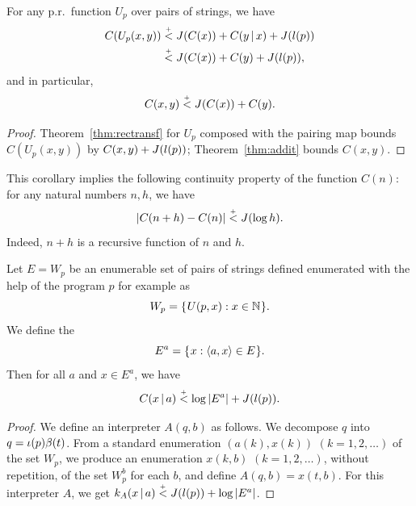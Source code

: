 \begin{corollary}
  \leanok
   \label{cy:funcofpair}
 For any p.r.~function \( U_{p} \) over pairs of strings, we have 
 \begin{align*} 
C(U_{p}(x,y)) &\stackrel{{}_+}{<}  J(C(x)) + C(y \,\vert\, x) + J(l(p))
  \\		  &\stackrel{{}_+}{<}  J(C(x)) + C(y) + J(l(p)),
 \end{align*}
  and in particular,
 \[
 	C(x,y) \stackrel{{}_+}{<} J(C(x)) + C(y).
 \]
 \end{corollary}
\begin{proof}
  \leanok
  Theorem~\ref{thm:rectransf} for $U_p$ composed with the pairing map bounds $C(U_p(x,y))$ by $C(x,y) + J(l(p))$; Theorem~\ref{thm:addit} bounds $C(x,y)$.
\end{proof}


This corollary implies the following continuity property of the function \( C(n) \):
for any natural numbers \( n,h \), we have
\begin{equation}
|C(n+h)-C(n)| \stackrel{{}_+}{<} J(\log h). \label{eq:continui}
\end{equation}
Indeed, \( n+h \) is a recursive function of \( n \) and \( h \).


\begin{theorem}
  \leanok
   \label{thm:condupbd}
 Let \( E=W_{p} \) be an enumerable set of pairs of strings defined
enumerated with the help of the program \( p \) for example as 
 \begin{equation} 
 W_{p}= \mathopen\{\mskip 1mu U(p,x): x\in \mathbb{N}\mskip 1mu\mathclose\}. \label{eq:Wp}
 \end{equation}
  We define the  
 \begin{equation} 
 E^a = \mathopen\{\mskip 1mu x :  \mathopen\langle a,x\mathclose\rangle  \in E \mskip 1mu\mathclose\}. \label{eq:sectiondef}
 \end{equation}
  Then for all \( a \) and \( x \in E^a \), we have 
 \[  
  C(x \,\vert\, a) \stackrel{{}_+}{<} \log|E^a| + J(l(p)).
 \]
 \end{theorem}

\begin{proof}
  \leanok
 We define an interpreter \( A(q,b) \) as follows. 
We decompose \( q \) into \( q = \iota(p) \beta(t) \). 
From a standard enumeration \( (a(k),x(k)) \)
\( (k=1,2,\ldots) \) of the set \( W_{p} \), we produce an enumeration \( x(k,b) \)
\( (k=1,2,\ldots) \), without repetition, of the set \( W_{p}^b \) for each
\( b \), and define \( A(q,b)=x(t,b) \). 
For this interpreter \( A \), we get
\( k_A(x \,\vert\, a) \stackrel{{}_+}{<} J(l(p)) + \log |E^a| \). 
 \end{proof}

